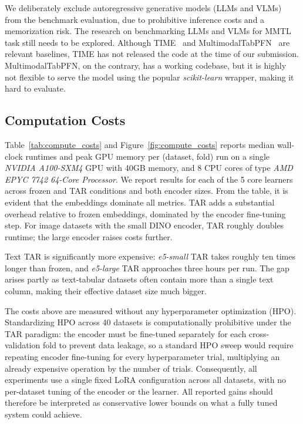 We deliberately exclude autoregressive generative models (LLMs and VLMs) from the benchmark evaluation, due to prohibitive inference costs and a memorization risk. The research on benchmarking LLMs and VLMs for MMTL task still needs to be explored. Although TIME~\cite{luo_time_2025} and MultimodalTabPFN~\cite{kim_multimodalpfn_2025} are relevant baselines, TIME has not released the code at the time of our submission. MultimodalTabPFN, on the contrary, has a working codebase, but it is highly not flexible to serve the model using the popular \textit{scikit-learn} \cite{pedregosa2011scikit} wrapper, making it hard to evaluate.

\subsection{Computation Costs}\label{tab:costs}

Table~\ref{tab:compute_costs} and Figure~\ref{fig:compute_costs} reports median wall-clock runtimes and peak GPU memory per (dataset, fold) run on a single \textit{NVIDIA A100-SXM4} GPU with 40GB memory,
and 8 CPU cores of type \textit{AMD EPYC 7742 64-Core Processor}. We report results for each of the 5 core learners across frozen and TAR conditions and both encoder sizes. From the table, it is evident that the embeddings dominate all metrics. TAR adds a substantial overhead relative to frozen embeddings, dominated by the encoder fine-tuning step. For image datasets with the small DINO encoder, TAR roughly doubles runtime; the large encoder raises costs further.

Text TAR is significantly more expensive: \textit{e5-small} TAR takes roughly ten times longer than frozen, and \textit{e5-large} TAR approaches three hours per run. The gap arises partly as text-tabular datasets often contain more than a single text column, making their effective dataset size much bigger.

The costs above are measured without any hyperparameter optimization (HPO).
Standardizing HPO across 40 datasets is computationally prohibitive under the TAR paradigm: the encoder must be fine-tuned separately for each cross-validation fold to prevent data leakage, so a standard HPO sweep would require repeating encoder fine-tuning for every hyperparameter trial, multiplying an already expensive operation by the number of trials.
Consequently, all experiments use a single fixed LoRA configuration across all datasets, with no per-dataset tuning of the encoder or the learner.
All reported gains should therefore be interpreted as conservative lower bounds on what a fully tuned system could achieve. 

